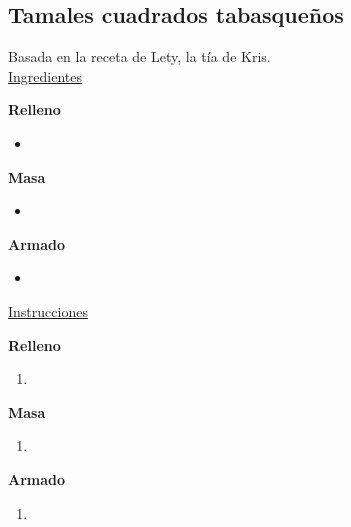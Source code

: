 \subsection{Tamales cuadrados tabasqueños}
\label{sec:tamales-cuadrados}

Basada en la receta de Lety, la tía de Kris.\\

\underline{Ingredientes}

\textbf{Relleno}
\begin{itemize}
\item 
\end{itemize}

\textbf{Masa}
\begin{itemize}
\item 
\end{itemize}

\textbf{Armado}
\begin{itemize}
\item 
\end{itemize}

\underline{Instrucciones}

\textbf{Relleno}
\begin{enumerate}
\item
\end{enumerate}

\textbf{Masa}
\begin{enumerate}
\item
\end{enumerate}

\textbf{Armado}
\begin{enumerate}
\item
\end{enumerate}